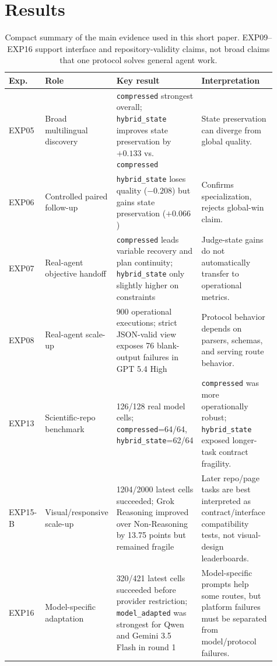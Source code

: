 \documentclass[11pt]{article}
\begin{document}
\section{Results}
\begin{table}[t]
\centering
\scriptsize
\begin{tabular}{p{0.13\linewidth}p{0.26\linewidth}p{0.22\linewidth}p{0.30\linewidth}}
\toprule
Exp. & Role & Key result & Interpretation\\
\midrule
EXP05 & Broad multilingual discovery & \texttt{compressed} strongest overall; \texttt{hybrid\_state} improves state preservation by $+0.133$ vs. \texttt{compressed} & State preservation can diverge from global quality.\\
EXP06 & Controlled paired follow-up & \texttt{hybrid\_state} loses quality ($-0.208$) but gains state preservation ($+0.066$) & Confirms specialization, rejects global-win claim.\\
EXP07 & Real-agent objective handoff & \texttt{compressed} leads variable recovery and plan continuity; \texttt{hybrid\_state} only slightly higher on constraints & Judge-state gains do not automatically transfer to operational metrics.\\
EXP08 & Real-agent scale-up & 900 operational executions; strict JSON-valid view exposes 76 blank-output failures in GPT 5.4 High & Protocol behavior depends on parsers, schemas, and serving route behavior.\\
EXP13 & Scientific-repo benchmark & 126/128 real model cells; \texttt{compressed}=64/64, \texttt{hybrid\_state}=62/64 & \texttt{compressed} was more operationally robust; \texttt{hybrid\_state} exposed longer-task contract fragility.\\
EXP15-B & Visual/responsive scale-up & 1204/2000 latest cells succeeded; Grok Reasoning improved over Non-Reasoning by 13.75 points but remained fragile & Later repo/page tasks are best interpreted as contract/interface compatibility tests, not visual-design leaderboards.\\
EXP16 & Model-specific adaptation & 320/421 latest cells succeeded before provider restriction; \texttt{model\_adapted} was strongest for Qwen and Gemini 3.5 Flash in round 1 & Model-specific prompts help some routes, but platform failures must be separated from model/protocol failures.\\
\bottomrule
\end{tabular}
\caption{Compact summary of the main evidence used in this short paper. EXP09--EXP16 support interface and repository-validity claims, not broad claims that one protocol solves general agent work.}
\label{tab:key_results}
\end{table}
\end{document}
